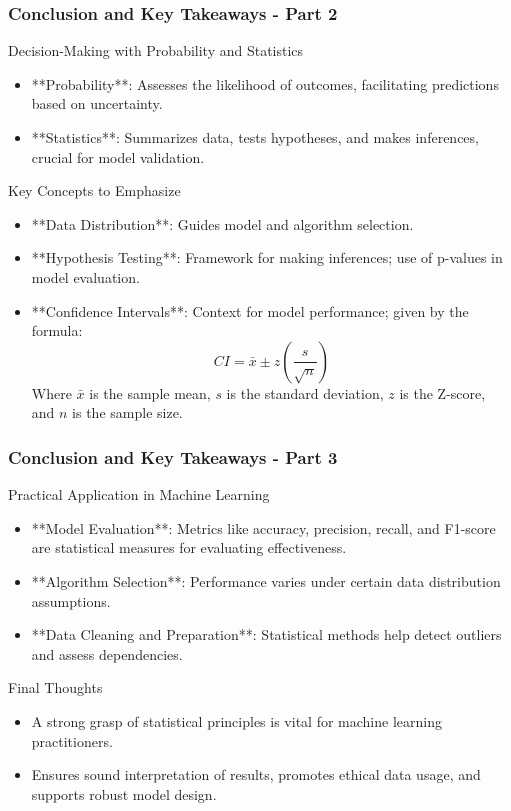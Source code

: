 \documentclass{beamer}
\begin{document}
\begin{frame}[fragile]
    \frametitle{Conclusion and Key Takeaways - Part 2}
    \begin{block}{Decision-Making with Probability and Statistics}
        \begin{itemize}
            \item **Probability**: Assesses the likelihood of outcomes, facilitating predictions based on uncertainty.
            \item **Statistics**: Summarizes data, tests hypotheses, and makes inferences, crucial for model validation.
        \end{itemize}
    \end{block}

    \begin{block}{Key Concepts to Emphasize}
        \begin{itemize}
            \item **Data Distribution**: Guides model and algorithm selection.
            \item **Hypothesis Testing**: Framework for making inferences; use of p-values in model evaluation.
            \item **Confidence Intervals**: Context for model performance; given by the formula:
            \[
            CI = \bar{x} \pm z \left( \frac{s}{\sqrt{n}} \right)
            \]
            Where \( \bar{x} \) is the sample mean, \( s \) is the standard deviation, \( z \) is the Z-score, and \( n \) is the sample size.
        \end{itemize}
    \end{block}
\end{frame}

\begin{frame}[fragile]
    \frametitle{Conclusion and Key Takeaways - Part 3}
    \begin{block}{Practical Application in Machine Learning}
        \begin{itemize}
            \item **Model Evaluation**: Metrics like accuracy, precision, recall, and F1-score are statistical measures for evaluating effectiveness.
            \item **Algorithm Selection**: Performance varies under certain data distribution assumptions.
            \item **Data Cleaning and Preparation**: Statistical methods help detect outliers and assess dependencies.
        \end{itemize}
    \end{block}

    \begin{block}{Final Thoughts}
        \begin{itemize}
            \item A strong grasp of statistical principles is vital for machine learning practitioners.
            \item Ensures sound interpretation of results, promotes ethical data usage, and supports robust model design.
        \end{itemize}
    \end{block}
\end{frame}
\end{document}
